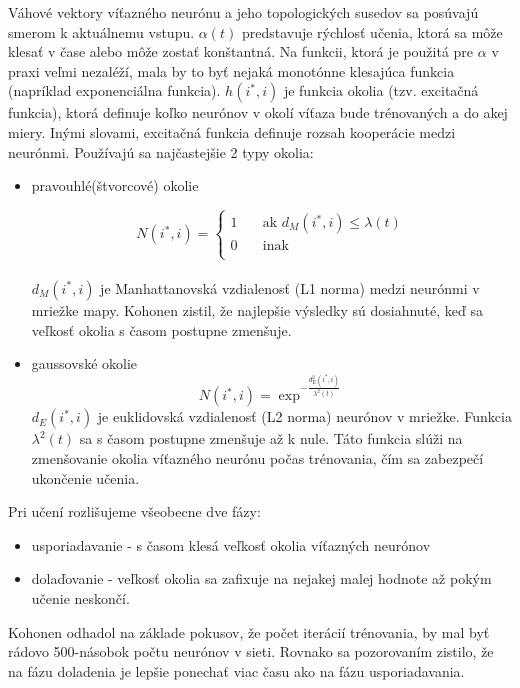 Váhové vektory víťazného neurónu a jeho topologických susedov sa posúvajú smerom k aktuálnemu vstupu.
$\alpha(t)$ predstavuje rýchlosť učenia, ktorá sa môže klesať v čase alebo môže zostať konštantná. Na funkcii, ktorá je použitá pre $\alpha$ v praxi veľmi nezaléží, mala by to byť nejaká monotónne klesajúca funkcia (napríklad exponenciálna funkcia). 
$h(i^*, i)$ je funkcia okolia (tzv. excitačná funkcia), ktorá definuje koľko neurónov v okolí víťaza bude trénovaných a do akej miery. Inými slovami, excitačná funkcia definuje rozsah kooperácie medzi neurónmi. Používajú sa najčastejšie 2 typy okolia:
\begin{itemize}
\item pravouhlé(štvorcové) okolie

\[
N(i^{*},i) =
     \begin{cases}
       \text{1} &\quad\text{ak } d_{M}(i^*, i) \leq \lambda(t) \\
       \text{0} &\quad\text{inak}\\
     \end{cases}
\]
\\
$d_{M}(i^{*}, i)$ je Manhattanovská vzdialenosť (L1 norma) medzi neurónmi v mriežke mapy. Kohonen zistil, že najlepšie výsledky sú dosiahnuté, keď
sa veľkosť okolia s časom postupne zmenšuje.
\item gaussovské okolie
	\begin{equation}
		N(i^{*}, i) = \exp^{- \frac{d^{2}_{E}(i^{*}, i)}{\lambda^{2}(t)}}
	\end{equation}
$d_{E}(i^{*}, i)$ je euklidovská vzdialenosť (L2 norma) neurónov v mriežke. Funkcia $\lambda^2(t)$ sa s časom postupne zmenšuje až k nule. Táto
	funkcia slúži na zmenšovanie okolia víťazného neurónu počas trénovania, čím sa zabezpečí ukončenie učenia.
\end{itemize}

Pri učení rozlišujeme všeobecne dve fázy:
\begin{itemize}
	\item usporiadavanie - s časom klesá veľkosť okolia víťazných neurónov 
	\item dolaďovanie - veľkosť okolia sa zafixuje na nejakej malej hodnote až pokým učenie neskončí.
\end{itemize}

Kohonen odhadol na základe pokusov, že počet iterácií trénovania, by mal byť rádovo 500-násobok počtu neurónov v sieti.
Rovnako sa pozorovaním zistilo, že na fázu doladenia je lepšie ponechať viac času ako na fázu usporiadavania.

